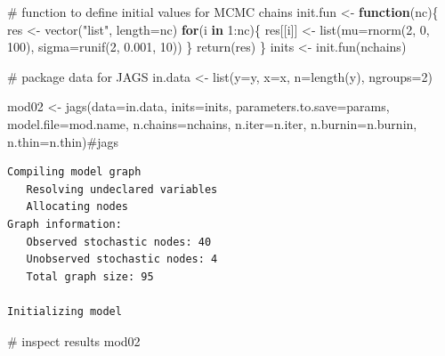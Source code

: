\documentclass[
  13,
  letterpaper,
]{report}
\newenvironment{Shaded}{\begin{snugshade}}{\end{snugshade}}
\newcommand{\AttributeTok}[1]{\textcolor[rgb]{0.40,0.45,0.13}{#1}}
\newcommand{\CommentTok}[1]{\textcolor[rgb]{0.37,0.37,0.37}{#1}}
\newcommand{\ControlFlowTok}[1]{\textcolor[rgb]{0.00,0.23,0.31}{\textbf{#1}}}
\newcommand{\DecValTok}[1]{\textcolor[rgb]{0.68,0.00,0.00}{#1}}
\newcommand{\FloatTok}[1]{\textcolor[rgb]{0.68,0.00,0.00}{#1}}
\newcommand{\FunctionTok}[1]{\textcolor[rgb]{0.28,0.35,0.67}{#1}}
\newcommand{\NormalTok}[1]{\textcolor[rgb]{0.00,0.23,0.31}{#1}}
\newcommand{\OtherTok}[1]{\textcolor[rgb]{0.00,0.23,0.31}{#1}}
\newcommand{\SpecialCharTok}[1]{\textcolor[rgb]{0.37,0.37,0.37}{#1}}
\newcommand{\StringTok}[1]{\textcolor[rgb]{0.13,0.47,0.30}{#1}}
\begin{document}
\begin{Shaded}
\begin{Highlighting}[]
\CommentTok{\# function to define initial values for MCMC chains}
\NormalTok{init.fun }\OtherTok{\textless{}{-}} \ControlFlowTok{function}\NormalTok{(nc)\{}
\NormalTok{    res }\OtherTok{\textless{}{-}} \FunctionTok{vector}\NormalTok{(}\StringTok{"list"}\NormalTok{, }\AttributeTok{length=}\NormalTok{nc)}
    \ControlFlowTok{for}\NormalTok{(i }\ControlFlowTok{in} \DecValTok{1}\SpecialCharTok{:}\NormalTok{nc)\{}
\NormalTok{        res[[i]] }\OtherTok{\textless{}{-}} \FunctionTok{list}\NormalTok{(}\AttributeTok{mu=}\FunctionTok{rnorm}\NormalTok{(}\DecValTok{2}\NormalTok{, }\DecValTok{0}\NormalTok{, }\DecValTok{100}\NormalTok{),}
                         \AttributeTok{sigma=}\FunctionTok{runif}\NormalTok{(}\DecValTok{2}\NormalTok{, }\FloatTok{0.001}\NormalTok{, }\DecValTok{10}\NormalTok{))}
\NormalTok{    \}}
    \FunctionTok{return}\NormalTok{(res)}
\NormalTok{\}}
\NormalTok{inits }\OtherTok{\textless{}{-}} \FunctionTok{init.fun}\NormalTok{(nchains)}

\CommentTok{\# package data for JAGS}
\NormalTok{in.data }\OtherTok{\textless{}{-}} \FunctionTok{list}\NormalTok{(}\AttributeTok{y=}\NormalTok{y, }\AttributeTok{x=}\NormalTok{x, }\AttributeTok{n=}\FunctionTok{length}\NormalTok{(y), }\AttributeTok{ngroups=}\DecValTok{2}\NormalTok{)}

\NormalTok{mod02 }\OtherTok{\textless{}{-}} \FunctionTok{jags}\NormalTok{(}\AttributeTok{data=}\NormalTok{in.data, }\AttributeTok{inits=}\NormalTok{inits,}
              \AttributeTok{parameters.to.save=}\NormalTok{params,}
              \AttributeTok{model.file=}\NormalTok{mod.name,}
              \AttributeTok{n.chains=}\NormalTok{nchains, }\AttributeTok{n.iter=}\NormalTok{n.iter,}
              \AttributeTok{n.burnin=}\NormalTok{n.burnin, }\AttributeTok{n.thin=}\NormalTok{n.thin)}\CommentTok{\#jags}
\end{Highlighting}
\end{Shaded}

\begin{verbatim}
Compiling model graph
   Resolving undeclared variables
   Allocating nodes
Graph information:
   Observed stochastic nodes: 40
   Unobserved stochastic nodes: 4
   Total graph size: 95

Initializing model
\end{verbatim}

\begin{Shaded}
\begin{Highlighting}[]
\CommentTok{\# inspect results}
\NormalTok{mod02}
\end{Highlighting}
\end{Shaded}
\end{document}
